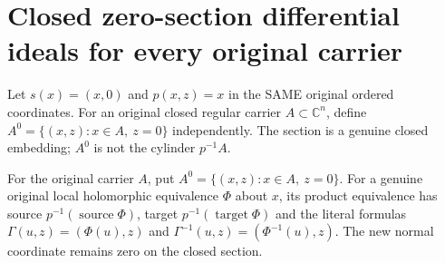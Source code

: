\chapter{Closed zero-section differential ideals for every original carrier}

Let $s(x)=(x,0)$ and $p(x,z)=x$ in the SAME original ordered coordinates. For an original closed regular carrier $A\subset\mathbb C^n$, define $A^0=\{(x,z):x\in A,\ z=0\}$ independently. The section is a genuine closed embedding; $A^0$ is not the cylinder $p^{-1}A$.

\begin{definition}
\label{hir:actual-zero-section-submanifold-lift}
\leanok
For the original carrier $A$, put $A^0=\{(x,z):x\in A,\ z=0\}$. For a genuine original local holomorphic equivalence $\Phi$ about $x$, its product equivalence has source $p^{-1}(\operatorname{source}\Phi)$, target $p^{-1}(\operatorname{target}\Phi)$ and the literal formulas $\Gamma(u,z)=(\Phi(u),z)$ and $\Gamma^{-1}(u,z)=(\Phi^{-1}(u),z)$. The new normal coordinate remains zero on the closed section.
\end{definition}

